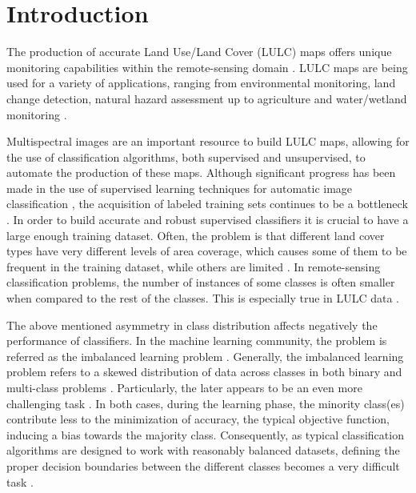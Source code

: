 \documentclass[remotesensing,article,submit,moreauthors,pdftex]{Definitions/mdpi}
\begin{document}

\section{Introduction}
The production of accurate Land Use/Land Cover (LULC) maps offers unique
monitoring capabilities within the remote-sensing domain \cite{Mellor2015}. LULC
maps are being used for a variety of applications, ranging from environmental
monitoring, land change detection, natural hazard assessment up to agriculture
and water/wetland monitoring \cite{Khatami2016}.

Multispectral images are an important resource to build LULC maps, allowing for
the use of classification algorithms, both supervised and unsupervised, to
automate the production of these maps. Although significant progress has been
made in the use of supervised learning techniques for automatic image
classification \cite{Tewkesbury2015}, the acquisition of labeled training sets
continues to be a bottleneck \cite{Rajan2008}. In order to build accurate and
robust supervised classifiers it is crucial to have a large enough training
dataset. Often, the problem is that different land cover types have very
different levels of area coverage, which causes some of them to be frequent in
the training dataset, while others are limited \cite{Feng2019}. In
remote-sensing classification problems, the number of instances of some classes
is often smaller when compared to the rest of the classes. This is especially
true in LULC data \cite{Williams2009, Cenggoro2018}.

The above mentioned asymmetry in class distribution affects negatively the
performance of classifiers. In the machine learning community, the problem is
referred as the imbalanced learning problem \cite{Chawla2004}. Generally, the
imbalanced learning problem refers to a skewed distribution of data across
classes in both binary and multi-class problems \cite{Abdi2016}. Particularly,
the later appears to be an even more challenging task \cite{Garcia2018}. In both
cases, during the learning phase, the minority class(es) contribute less to the
minimization of accuracy, the typical objective function, inducing a bias
towards the majority class. Consequently, as typical classification algorithms
are designed to work with reasonably balanced datasets, defining the proper
decision boundaries between the different classes becomes a very difficult task
\cite{Saez2016}.
\end{document}

